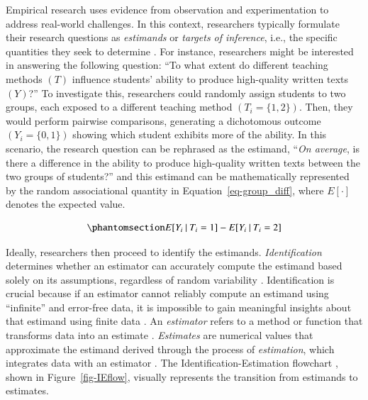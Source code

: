 \documentclass[
  authoryear,
  review,
  1p]{elsarticle}
\begin{document}
Empirical research uses evidence from observation and experimentation to
address real-world challenges. In this context, researchers typically
formulate their research questions as \emph{estimands} or \emph{targets
of inference}, i.e., the specific quantities they seek to determine
\citep{Everitt_et_al_2010}. For instance, researchers might be
interested in answering the following question: ``To what extent do
different teaching methods \((T)\) influence students' ability to
produce high-quality written texts \((Y)\)?'' To investigate this,
researchers could randomly assign students to two groups, each exposed
to a different teaching method \((T_{i} = \{1,2\})\). Then, they would
perform pairwise comparisons, generating a dichotomous outcome
\((Y_{i} = \{0,1\})\) showing which student exhibits more of the
ability. In this scenario, the research question can be rephrased as the
estimand, ``\emph{On average}, is there a difference in the ability to
produce high-quality written texts between the two groups of students?''
and this estimand can be mathematically represented by the random
associational quantity in Equation~\ref{eq-group_diff}, where
\(E[\cdot]\) denotes the expected value.

\begin{equation}\phantomsection\label{eq-group_diff}{
E[Y_{i} \:|\:T_{i}=1] - E[Y_{i} \:|\:T_{i}=2]
}\end{equation}

Ideally, researchers then proceed to identify the estimands.
\emph{Identification} determines whether an estimator can accurately
compute the estimand based solely on its assumptions, regardless of
random variability \citep[pp.~4]{Schuessler_et_al_2023}. Identification
is crucial because if an estimator cannot reliably compute an estimand
using ``infinite'' and error-free data, it is impossible to gain
meaningful insights about that estimand using finite data
\citep[pp.~5]{Schuessler_et_al_2023}. An \emph{estimator} refers to a
method or function that transforms data into an estimate
\citep{Neal_2020}. \emph{Estimates} are numerical values that
approximate the estimand derived through the process of
\emph{estimation}, which integrates data with an estimator
\citep{Everitt_et_al_2010}. The Identification-Estimation flowchart
\citep{McElreath_2020, Neal_2020}, shown in Figure~\ref{fig-IEflow},
visually represents the transition from estimands to estimates.
\end{document}
